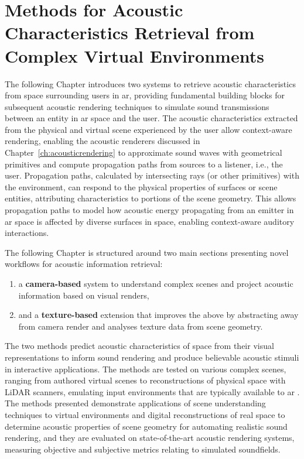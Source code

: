 \chapter{Methods for Acoustic Characteristics Retrieval from Complex Virtual Environments} %
\label{ch:Materials}
The following Chapter introduces two systems to retrieve acoustic characteristics from space surrounding users in \acrshort{ar}, providing fundamental building blocks for subsequent acoustic rendering techniques to simulate sound transmissions between an entity in \acrshort{ar} space and the user. The acoustic characteristics extracted from the physical and virtual scene experienced by the user allow context-aware rendering, enabling the acoustic renderers discussed in Chapter~\ref{ch:acousticrendering} to approximate sound waves with geometrical primitives and compute propagation paths from sources to a listener, i.e., the user. Propagation paths, calculated by intersecting rays (or other primitives) with the environment, can respond to the physical properties of surfaces or scene entities, attributing characteristics to portions of the scene geometry. This allows propagation paths to model how acoustic energy propagating from an emitter in \acrshort{ar} space is affected by diverse surfaces in space, enabling context-aware auditory interactions.\par
The following Chapter is structured around two main sections presenting novel workflows for acoustic information retrieval:
\begin{enumerate}
    \item a \textbf{camera-based} system to understand complex scenes and project acoustic information based on visual renders,
    \item and a \textbf{texture-based} extension that improves the above by abstracting away from camera render and analyses texture data from scene geometry.
\end{enumerate}
The two methods predict acoustic characteristics of space from their visual representations to inform sound rendering and produce believable acoustic stimuli in interactive applications. The methods are tested on various complex scenes, ranging from authored virtual scenes to reconstructions of physical space with LiDAR scanners, emulating input environments that are typically available to \acrshort{ar} . The methods presented demonstrate applications of scene understanding techniques to virtual environments and digital reconstructions of real space to determine acoustic properties of scene geometry for automating realistic sound rendering, and they are evaluated on state-of-the-art acoustic rendering systems, measuring objective and subjective metrics relating to simulated soundfields.\par

